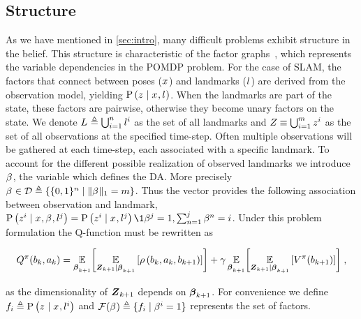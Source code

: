 \subsection{Structure}
As we have mentioned in \cref{sec:intro}, many difficult problems exhibit structure in the belief. This structure is characteristic of the factor graphs~\cite{Koller09book}, which represents the variable dependencies in the POMDP problem. For the case of SLAM, the factors that connect between poses ($\state{}$) and landmarks ($\landmark{}$) are derived from the observation model, yielding $\probcond{\observation{}{}}{\state{},\landmark{}}$. When the landmarks are part of the state, these factors are pairwise, otherwise they become unary factors on the state. We denote $\landmarks{}\triangleq\bigcup_{i=1}^n\landmark{i}$ as the set of all landmarks and $\observations{}\equiv\bigcup_{i=1}^m\observation{}{i}$ as the set of all observations at the specified time-step. Often multiple observations will be gathered at each time-step, each associated with a specific landmark. To account for the different possible realization of observed landmarks we introduce $\da{}{}$, the variable which defines the DA. More precisely $\da{}{}\in\mathcal{D}\triangleq\left\{\{0,1\}^{n}\mid\norm{\da{}{}}_1=m\right\}$. Thus the vector provides the following association between observation and landmark, $\probcond{\observation{}{i}}{\state{},\da{}{},\landmark{j}}=\probcond{\observation{}{i}}{\state{},\landmark{j}}\1{\da{}{j}=1,\sum_{n=1}^{j}\da{}{n}=i}$. Under this problem formulation the Q-function must be rewritten as
\begin{small}
	\begin{equation}
		Q^\pi(\blf{k},\action{k})=\E_{\daRV{k+1}{}}\biggl[{\expectation{\reward{\blf{k},\action{k},\blf{k+1}}}{\observationsRV{k+1}\mid\daRV{k+1}{}}}\biggr]+\gamma\E_{\daRV{k+1}{}}\biggl[\expectation{V^\pi(\blf{k+1})}{\observationsRV{k+1}\mid\daRV{k+1}{}}\biggr]\;,\label{eq:da_bellman}
	\end{equation}
\end{small}
as the dimensionality of $\observationsRV{k+1}$ depends on $\daRV{k+1}{}$. For convenience we define $f_i\triangleq\probcond{\observation{}{}}{\state{},\landmark{i}}$ and $\mathcal{F}(\da{}{})\triangleq\{f_i\mid\da{}{i}=1\}$ represents the set of factors.